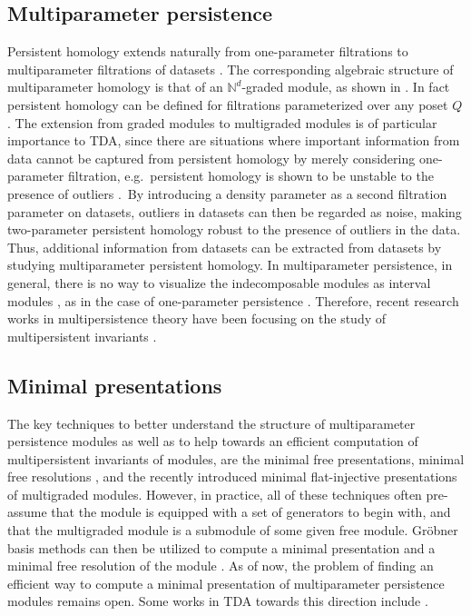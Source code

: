 \documentclass[oneside]{amsart}
\theoremstyle{definition}
\begin{document}
\subsection{Multiparameter persistence} Persistent homology extends naturally from one-parameter filtrations \cite{ZomorodianCarlsson2005} to multiparameter filtrations of datasets \cite{CarlssonZomorodian2009}. The corresponding algebraic structure of multiparameter homology is that of an $\mathbb{N}^d$-graded module, as shown in \cite{CarlssonZomorodian2009}.
In fact persistent homology can be defined for filtrations parameterized over any poset $Q$ \cite{BubenikScott2014}.
The extension from graded modules to multigraded modules is of particular importance to TDA, since there are situations where important information from data cannot be captured from persistent homology by merely considering one-parameter filtration, e.g.~persistent homology is shown to be unstable to the presence of outliers \cite{CarlssonZomorodian2009,LesnickWright2015}.~By introducing a density parameter as a second filtration parameter on datasets, outliers in datasets can then be regarded as noise, making two-parameter persistent homology robust to the presence of outliers in the data. Thus, additional information from datasets can be extracted from datasets by studying multiparameter persistent homology.   
In multiparameter persistence, in general, there is no way to visualize the indecomposable modules as interval modules \cite{CarlssonZomorodian2009, DeyXin2022}, as in the case of one-parameter persistence \cite{BotnanCrawley-Boevey2020,Crawley-Boevey2015}. 
Therefore, recent research works in multipersistence theory have been focusing on the study of multipersistent invariants \cite{KimMemoli2021,Patel2018}.

\subsection{Minimal presentations}The key techniques to better understand the structure of multiparameter persistence modules as well as to help towards an efficient computation of multipersistent invariants of modules, are the minimal free presentations, minimal free resolutions  \cite{CoxLittleOShea2005}, and the recently introduced  minimal flat-injective presentations \cite{Miller2020a} of multigraded modules. 
However, in practice, all of these techniques often pre-assume that the module is equipped with a set of generators to begin with, and that the  multigraded module is a submodule of some given free module.
Gröbner basis methods can then be utilized to compute a minimal presentation and a minimal free resolution of the module \cite{CoxLittleOShea2005,LaScalaStillman1998,MillerSturmfels2005}.
As of now, the problem of finding an efficient way to compute a minimal presentation of multiparameter persistence modules remains open. 
Some works in TDA towards this direction include \cite{CarlssonSinghZomorodian2010,ChachólskiScolamieroVaccarino2017,LesnickWright2022}.
\end{document}
